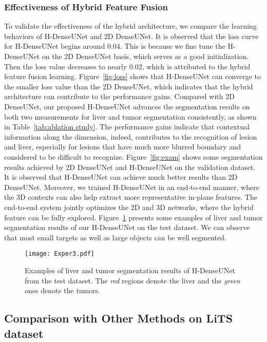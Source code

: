 \documentclass[journal]{IEEEtran}
\begin{document}
\subsubsection{Effectiveness of Hybrid Feature Fusion}
To validate the effectiveness of the hybrid architecture, we compare the learning behaviors of H-DenseUNet and 2D DenseUNet.
It is observed that the loss curve for H-DenseUNet begins around 0.04. This is because we fine tune the H-DenseUNet on the 2D DenseUNet basis, which serves as a good initialization.
Then the loss value decreases to nearly 0.02, which is attributed to the hybrid feature fusion learning.
Figure~\ref{fig:loss} shows that H-DenseUNet can converge to the smaller loss value than the 2D DenseUNet, which indicates that the hybrid architecture can contribute to the performance gains.
Compared with 2D DenseUNet, our proposed H-DenseUNet advances the segmentation results on both two measurements for liver and tumor segmentation consistently, as shown in Table~\ref{tab:ablation study}.
The performance gains indicate that contextual information along the  dimension, indeed, contributes to the recognition of lesion and liver, especially for lesions that have much more blurred boundary and considered to be difficult to recognize.
Figure~\ref{fig:exam} shows some segmentation results achieved by 2D DenseUNet and H-DenseUNet on the validation dataset. It is observed that H-DenseUNet can achieve much better results than 2D DenseUNet.
Moreover, we trained H-DenseUNet in an end-to-end manner, where the 3D contexts can also help extract more representative in-plane features.
The end-to-end system jointly optimizes the 2D and 3D networks, where the hybrid feature can be fully explored.
Figure~\ref{fig:result} presents some examples of liver and tumor segmentation results of our H-DenseUNet on the test dataset. We can observe that most small targets as well as large objects can be well segmented.
\begin{figure}[!t]
	\centering
	\texttt{[image: Exper3.pdf]}
	\caption{Examples of liver and tumor segmentation results of H-DenseUNet from the test dataset. The \emph{red} regions denote the liver and the \emph{green} ones denote the tumors.}
	\label{fig:result}\centering
\end{figure}
\subsection{Comparison with Other Methods on LiTS dataset}
\end{document}
